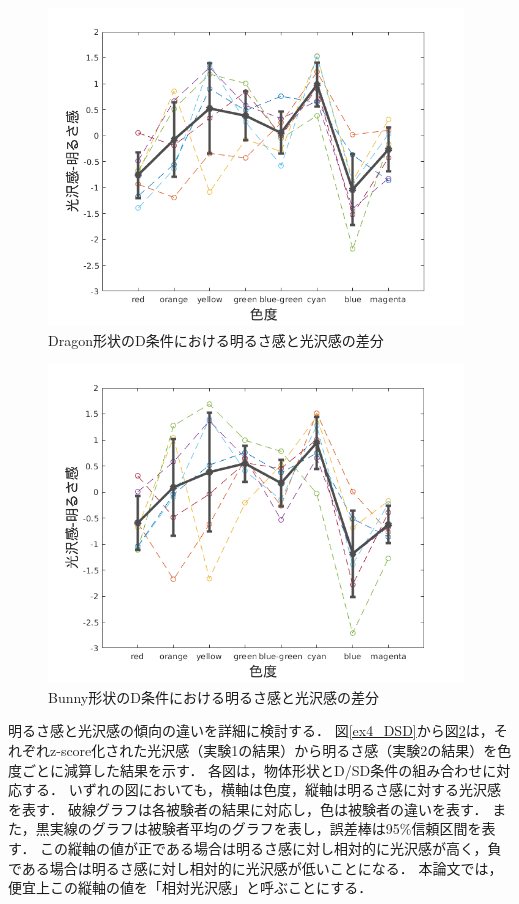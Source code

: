             \newpage
            \begin{figure}[h]
                \centering
                \includegraphics[width=11.0cm]{./img/ex4_DD.png}
                \caption{Dragon形状のD条件における明るさ感と光沢感の差分}
                \label{ex4_DD}
            \end{figure}

            \begin{figure}[h]
                \centering
                \includegraphics[width=11.0cm]{./img/ex4_BD.png}
                \caption{Bunny形状のD条件における明るさ感と光沢感の差分}
                \label{ex4_BD}
            \end{figure}

            明るさ感と光沢感の傾向の違いを詳細に検討する． 
            図\ref{ex4_DSD}から図\ref{ex4_BD}は，それぞれz-score化された光沢感（実験1の結果）から明るさ感（実験2の結果）を色度ごとに減算した結果を示す．
            各図は，物体形状とD/SD条件の組み合わせに対応する．
            いずれの図においても，横軸は色度，縦軸は明るさ感に対する光沢感を表す．
            破線グラフは各被験者の結果に対応し，色は被験者の違いを表す．
            また，黒実線のグラフは被験者平均のグラフを表し，誤差棒は95\%信頼区間を表す．
            この縦軸の値が正である場合は明るさ感に対し相対的に光沢感が高く，負である場合は明るさ感に対し相対的に光沢感が低いことになる．
            本論文では，便宜上この縦軸の値を「相対光沢感」と呼ぶことにする．
            
